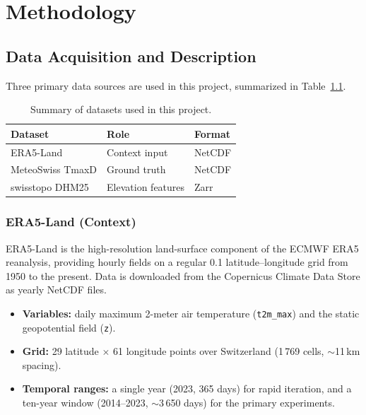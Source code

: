 \chapter{Methodology}
\section{Data Acquisition and Description}

Three primary data sources are used in this project, summarized in Table~\ref{tab:datasets}.

\begin{table}[ht]
\centering
\caption{Summary of datasets used in this project.}
\label{tab:datasets}
\begin{tabular}{@{}lll@{}}
\toprule
\textbf{Dataset} & \textbf{Role} & \textbf{Format} \\
\midrule
ERA5-Land         & Context input      & NetCDF \\
MeteoSwiss TmaxD  & Ground truth       & NetCDF \\
swisstopo DHM25   & Elevation features & Zarr \\
\bottomrule
\end{tabular}
\end{table}

\subsection{ERA5-Land (Context)}

ERA5-Land \citep{era5land} is the high-resolution land-surface component of the ECMWF ERA5 reanalysis, providing hourly fields on a regular 0.1\textdegree{} latitude--longitude grid from 1950 to the present. Data is downloaded from the Copernicus Climate Data Store as yearly NetCDF files.

\begin{itemize}
    \item \textbf{Variables:} daily maximum 2-meter air temperature (\texttt{t2m\_max}) and the static geopotential field (\texttt{z}).
    \item \textbf{Grid:} 29 latitude $\times$ 61 longitude points over Switzerland (1\,769 cells, $\sim$11\,km spacing).
    \item \textbf{Temporal ranges:} a single year (2023, 365 days) for rapid iteration, and a ten-year window (2014--2023, $\sim$3\,650 days) for the primary experiments.
\end{itemize}

